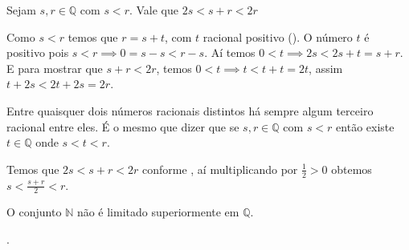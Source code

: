 \documentclass[../main.tex]{subfiles}
\begin{document}
\begin{prop}\label{rac-prop-somaEntreDobro}
    Sejam $s, r \in \mathbb{Q}$ com $s < r$. Vale que $2s < s+r < 2r$
\end{prop}
\begin{dem}
    Como $s < r$ temos que $r = s + t$, com $t$ racional positivo ().
    O número $t$ é positivo pois $s < r \implies 0 = s-s < r-s$. Aí temos $0 < t \implies 2s < 2s+t = s+r$. E para mostrar que $s+r < 2r$, temos
    $0 < t \implies t < t+t = 2t$, assim $t+2s < 2t+2s = 2r$. 
\end{dem}

\begin{corol}\label{rac-corol-terceiroEntreDois}
    Entre quaisquer dois números racionais distintos há sempre algum terceiro racional entre eles. É o mesmo que dizer
    que se $s,r \in \mathbb{Q}$ com $s<r$ então existe $t \in \mathbb{Q}$ onde $s < t < r$.
\end{corol}
\begin{dem}
    Temos que $2s < s+r < 2r$ conforme , aí multiplicando por $\frac{1}{2} > 0$ obtemos $s < \frac{s+r}{2} < r$.
\end{dem}

\begin{teo}\label{rac-teo-ilimitadoSuperiormente}
    O conjunto $\mathbb{N}$ não é limitado superiormente em $\mathbb{Q}$.
\end{teo}
\begin{dem}
    .
\end{dem}
\end{document}
